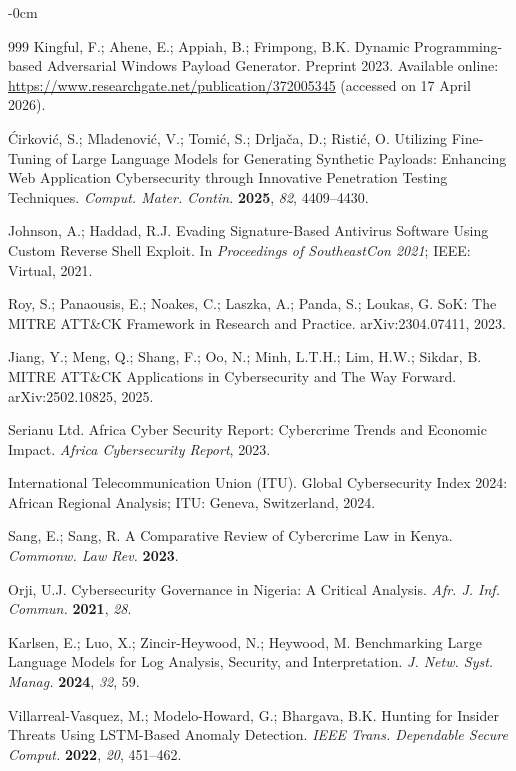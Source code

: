 \documentclass[futureinternet,article,submit,pdftex,moreauthors]{Definitions/mdpi}
\begin{document}
\begin{adjustwidth}{-\extralength}{0cm}
\begin{thebibliography}{999}
Kingful, F.; Ahene, E.; Appiah, B.; Frimpong, B.K. Dynamic Programming-based Adversarial
Windows Payload Generator. Preprint 2023. Available online:
\url{https://www.researchgate.net/publication/372005345} (accessed on 17 April 2026).

\'Cirkovi\'c, S.; Mladenovi\'c, V.; Tomi\'c, S.; Drlja\v{c}a, D.; Risti\'c, O.
Utilizing Fine-Tuning of Large Language Models for Generating Synthetic Payloads:
Enhancing Web Application Cybersecurity through Innovative Penetration Testing Techniques.
\textit{Comput. Mater. Contin.} \textbf{2025}, \textit{82}, 4409--4430.

Johnson, A.; Haddad, R.J. Evading Signature-Based Antivirus Software Using Custom Reverse
Shell Exploit. In \textit{Proceedings of SoutheastCon 2021}; IEEE: Virtual, 2021.

Roy, S.; Panaousis, E.; Noakes, C.; Laszka, A.; Panda, S.; Loukas, G. SoK: The MITRE
ATT\&CK Framework in Research and Practice. arXiv:2304.07411, 2023.

Jiang, Y.; Meng, Q.; Shang, F.; Oo, N.; Minh, L.T.H.; Lim, H.W.; Sikdar, B. MITRE
ATT\&CK Applications in Cybersecurity and The Way Forward. arXiv:2502.10825, 2025.

Serianu Ltd. Africa Cyber Security Report: Cybercrime Trends and Economic Impact.
\textit{Africa Cybersecurity Report}, 2023.

International Telecommunication Union (ITU). Global Cybersecurity Index 2024: African
Regional Analysis; ITU: Geneva, Switzerland, 2024.

Sang, E.; Sang, R. A Comparative Review of Cybercrime Law in Kenya.
\textit{Commonw. Law Rev.} \textbf{2023}.

Orji, U.J. Cybersecurity Governance in Nigeria: A Critical Analysis.
\textit{Afr. J. Inf. Commun.} \textbf{2021}, \textit{28}.

Karlsen, E.; Luo, X.; Zincir-Heywood, N.; Heywood, M. Benchmarking Large Language Models
for Log Analysis, Security, and Interpretation.
\textit{J. Netw. Syst. Manag.} \textbf{2024}, \textit{32}, 59.

Villarreal-Vasquez, M.; Modelo-Howard, G.; Bhargava, B.K. Hunting for Insider Threats
Using LSTM-Based Anomaly Detection.
\textit{IEEE Trans. Dependable Secure Comput.} \textbf{2022}, \textit{20}, 451--462.


\end{thebibliography}
\end{adjustwidth}
\end{document}
